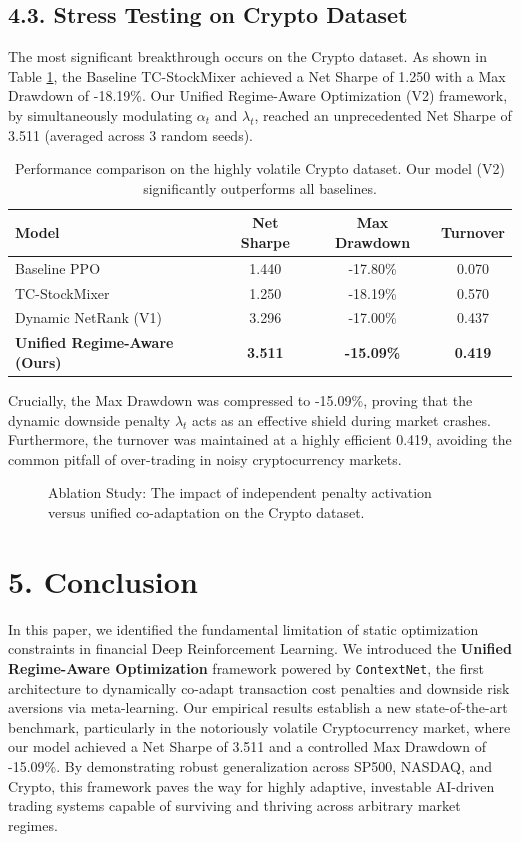 \documentclass[letterpaper]{article} %
\begin{document}
\subsection{4.3. Stress Testing on Crypto Dataset}
The most significant breakthrough occurs on the Crypto dataset. As shown in Table \ref{tab:crypto_results}, the Baseline TC-StockMixer achieved a Net Sharpe of 1.250 with a Max Drawdown of -18.19\%. Our Unified Regime-Aware Optimization (V2) framework, by simultaneously modulating $\alpha_t$ and $\lambda_t$, reached an unprecedented Net Sharpe of 3.511 (averaged across 3 random seeds).

\begin{table}[h]
\centering
\begin{tabular}{lccc}
\toprule
\textbf{Model} & \textbf{Net Sharpe} & \textbf{Max Drawdown} & \textbf{Turnover} \\
\midrule
Baseline PPO & 1.440 & -17.80\% & 0.070 \\
TC-StockMixer & 1.250 & -18.19\% & 0.570 \\
Dynamic NetRank (V1) & 3.296 & -17.00\% & 0.437 \\
\textbf{Unified Regime-Aware (Ours)} & \textbf{3.511} & \textbf{-15.09\%} & \textbf{0.419} \\
\bottomrule
\end{tabular}
\caption{Performance comparison on the highly volatile Crypto dataset. Our model (V2) significantly outperforms all baselines.}
\label{tab:crypto_results}
\end{table}

Crucially, the Max Drawdown was compressed to -15.09\%, proving that the dynamic downside penalty $\lambda_t$ acts as an effective shield during market crashes. Furthermore, the turnover was maintained at a highly efficient 0.419, avoiding the common pitfall of over-trading in noisy cryptocurrency markets.

\begin{figure}[h]
\centering
\caption{Ablation Study: The impact of independent penalty activation versus unified co-adaptation on the Crypto dataset.}
\label{fig:ablation}
\end{figure}

\section{5. Conclusion}
In this paper, we identified the fundamental limitation of static optimization constraints in financial Deep Reinforcement Learning. We introduced the \textbf{Unified Regime-Aware Optimization} framework powered by \texttt{ContextNet}, the first architecture to dynamically co-adapt transaction cost penalties and downside risk aversions via meta-learning. Our empirical results establish a new state-of-the-art benchmark, particularly in the notoriously volatile Cryptocurrency market, where our model achieved a Net Sharpe of 3.511 and a controlled Max Drawdown of -15.09\%. By demonstrating robust generalization across SP500, NASDAQ, and Crypto, this framework paves the way for highly adaptive, investable AI-driven trading systems capable of surviving and thriving across arbitrary market regimes.


\end{document}
